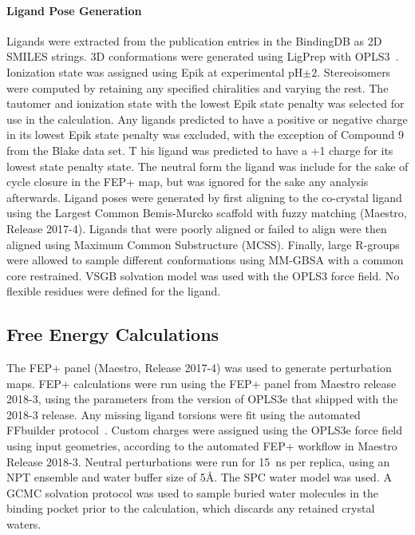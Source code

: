 \documentclass[phd,tocprelim]{cornell}
\begin{document}
\paragraph{Ligand Pose Generation}

Ligands were extracted from the publication entries in the BindingDB as 2D SMILES strings. 
3D conformations were generated using LigPrep with OPLS3~\citep{Harder:J.Chem.TheoryComput.:2016}. 
Ionization state was assigned using Epik at experimental pH$\pm2$. Stereoisomers were computed by retaining any specified chiralities and varying the rest. 
The tautomer and ionization state with the lowest Epik state penalty was selected for use in the calculation. 
Any ligands predicted to have a positive or negative charge in its lowest Epik state penalty was excluded, with the exception of Compound 9 from the Blake data set. T
his ligand was predicted to have a +1 charge for its lowest state penalty state. The neutral form the ligand was include for the sake of cycle closure in the FEP+ map, but was ignored for the sake any analysis afterwards. 
Ligand poses were generated by first aligning to the co-crystal ligand using the Largest Common Bemis-Murcko scaffold with fuzzy matching (Maestro, Release 2017-4). 
Ligands that were poorly aligned or failed to align were then aligned using Maximum Common Substructure (MCSS). 
Finally, large R-groups were allowed to sample different conformations using MM-GBSA with a common core restrained. VSGB solvation model was used with the OPLS3 force field. 
No flexible residues were defined for the ligand. 

\subsection{Free Energy Calculations}

The FEP+ panel (Maestro, Release 2017-4) was used to generate perturbation maps. FEP+ calculations were run using the FEP+ panel from Maestro release 2018-3, using the parameters from the version of OPLS3e that shipped with the 2018-3 release. Any missing ligand torsions were fit using the automated FFbuilder protocol~\citep{Abel2017-gw}. 
Custom charges were assigned using the OPLS3e force field using input geometries, according to the automated FEP+ workflow in Maestro Release 2018-3. Neutral perturbations were run for 15~ns per replica, using an NPT ensemble and water buffer size of 5\AA. 
The SPC water model was used. 
A GCMC solvation protocol was used to sample buried water molecules in the binding pocket prior to the calculation, which discards any retained crystal waters. 
\end{document}
